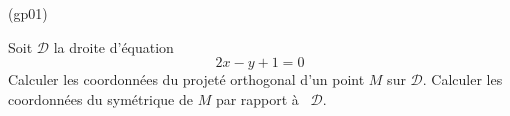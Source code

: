 \begin{tiny}(gp01)\end{tiny}
Soit $\mathcal{D}$ la droite d'équation
\[2x-y+1=0\]
Calculer les coordonnées du projeté orthogonal d'un point $M$ sur $\mathcal{D}$. Calculer les coordonnées du symétrique de $M$ par rapport à  $\mathcal{D}$.

